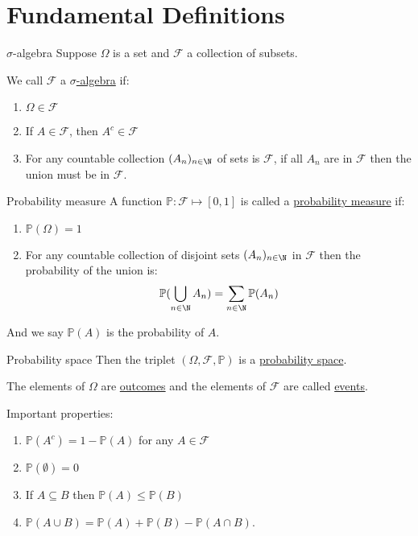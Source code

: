 \documentclass[../Main.tex]{subfiles}
\begin{document}
\section{Fundamental Definitions}
\begin{definition}{$\sigma$-algebra}
    Suppose $\Omega$ is a set and $\mathcal{F}$ a collection of subsets.\par
    We call $\mathcal{F}$ a \underline{$\sigma$-algebra} if:
    \begin{enumerate}
        \item $\Omega \in \mathcal{F}$
        \item If $A \in \mathcal{F}$, then $A^c \in \mathcal{F}$ %
        \item For any countable collection $(A_n)_{n \in \N}$ of sets is $\mathcal{F}$, if all $A_n$ are in $\mathcal{F}$ then the union must be in $\mathcal{F}$.
    \end{enumerate}
\end{definition}
\begin{definition}{Probability measure}
    A function $\mathbb{P} : \mathcal{F} \mapsto [0, 1]$ is called a \underline{probability measure} if:
    \begin{enumerate}
        \item $\mathbb{P}(\Omega) = 1$
        \item For any countable collection of disjoint sets $(A_n)_{n \in \N}$ in $\mathcal{F}$ then the probability of the union is:
            \begin{equation*}
                \mathbb{P}(\bigcup_{n \in \N} A_n) = \sum_{n \in \N} \mathbb{P}(A_n)
            \end{equation*}
    \end{enumerate}
    And we say $\mathbb{P}(A)$ is the probability of $A$.
\end{definition}
\begin{definition}{Probability space}
    Then the triplet $(\Omega, \mathcal{F}, \mathbb{P})$ is a \underline{probability space}.\par
    The elements of $\Omega$ are \underline{outcomes} and the elements of $\mathcal{F}$ are called \underline{events}.
\end{definition}
Important properties:
\begin{enumerate}
    \item $\mathbb{P}(A^c) = 1 -\mathbb{P}(A)$ for any $A \in \mathcal{F}$
    \item $\mathbb{P}(\emptyset) = 0$
    \item If $A \subseteq B$ then $\mathbb{P}(A) \leq \mathbb{P}(B)$
    \item $\mathbb{P}(A \cup B) = \mathbb{P}(A) + \mathbb{P}(B) - \mathbb{P}(A \cap B)$.
\end{enumerate}
\end{document}
